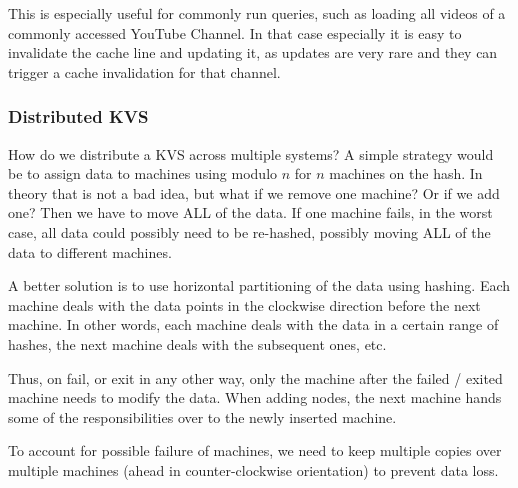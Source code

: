 This is especially useful for commonly run queries, such as loading all videos of a commonly accessed YouTube Channel.
In that case especially it is easy to invalidate the cache line and updating it, as updates are very rare and they can trigger a cache invalidation for that channel.


\subsubsection{Distributed KVS}
How do we distribute a KVS across multiple systems?
A simple strategy would be to assign data to machines using modulo $n$ for $n$ machines on the hash.
In theory that is not a bad idea, but what if we remove one machine? Or if we add one? Then we have to move ALL of the data.
If one machine fails, in the worst case, all data could possibly need to be re-hashed, possibly moving ALL of the data to different machines.

A better solution is to use horizontal partitioning of the data using hashing.
Each machine deals with the data points in the clockwise direction before the next machine.
In other words, each machine deals with the data in a certain range of hashes, the next machine deals with the subsequent ones, etc.

Thus, on fail, or exit in any other way, only the machine after the failed / exited machine needs to modify the data.
When adding nodes, the next machine hands some of the responsibilities over to the newly inserted machine.

To account for possible failure of machines, we need to keep multiple copies over multiple machines (ahead in counter-clockwise orientation)
to prevent data loss.
